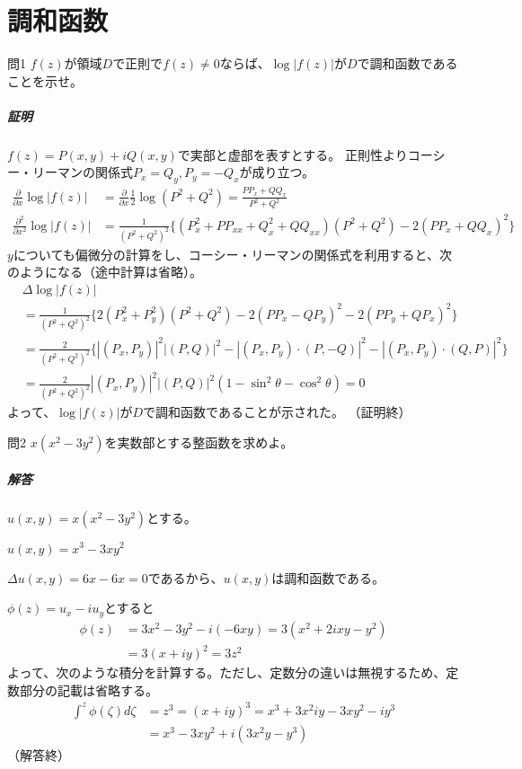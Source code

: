 \chapter{調和函数}%

\begin{mysimplebox}{問1}
    $f(z)$が領域$D$で正則で$f(z)\neq0$ならば、$\log|f(z)|$が$D$で調和函数であることを示せ。
\end{mysimplebox}
\paragraph{証明}
$f(z)=P(x,y)+iQ(x,y)$で実部と虚部を表すとする。
正則性よりコーシー・リーマンの関係式$P_x=Q_y,P_y=-Q_x$が成り立つ。
\begin{align*}
    \frac{\partial}{\partial x}\log|f(z)|
    &=\frac{\partial}{\partial x}\frac{1}{2}\log(P^2+Q^2)
    =\frac{PP_x+QQ_x}{P^2+Q^2}\\
    \frac{\partial^2}{\partial x^2}\log|f(z)|
    &=\frac{1}{(P^2+Q^2)^2}\{(P_x^2+PP_{xx}+Q_x^2+QQ_{xx})(P^2+Q^2)-2(PP_x+QQ_x)^2\}
\end{align*}
$y$についても偏微分の計算をし、コーシー・リーマンの関係式を利用すると、次のようになる（途中計算は省略）。
\begin{align*}
    &\Delta\log|f(z)|\\
    &=\frac{1}{(P^2+Q^2)^2}\{2(P_x^2+P_y^2)(P^2+Q^2)-2(PP_x-QP_y)^2-2(PP_y+QP_x)^2\}\\
    &=\frac{2}{(P^2+Q^2)^2}\{|(P_x,P_y)|^2|(P,Q)|^2-|(P_x,P_y)\cdot(P,-Q)|^2-|(P_x,P_y)\cdot(Q,P)|^2\}\\
    &=\frac{2}{(P^2+Q^2)^2}|(P_x,P_y)|^2|(P,Q)|^2(1-\sin^2\theta-\cos^2\theta)=0
\end{align*}
よって、$\log|f(z)|$が$D$で調和函数であることが示された。
（証明終）

\newpage
\begin{mysimplebox}{問2}
    $x(x^2-3y^2)$を実数部とする整函数を求めよ。
\end{mysimplebox}
\paragraph{解答}
$u(x,y)=x(x^2-3y^2)$とする。

$u(x,y)=x^3-3xy^2$

$\Delta u(x,y)=6x-6x=0$であるから、$u(x,y)$は調和函数である。

$\phi(z)=u_x-iu_y$とすると
\begin{align*}
    \phi(z)&=3x^2-3y^2-i(-6xy)=3(x^2+2ixy-y^2)\\
    &=3(x+iy)^2=3z^2
\end{align*}
よって、次のような積分を計算する。ただし、定数分の違いは無視するため、定数部分の記載は省略する。
\begin{align*}
    \int^{z}\phi(\zeta)d\zeta
    &=z^3=(x+iy)^3=x^3+3x^2iy-3xy^2-iy^3\\
    &=x^3-3xy^2+i(3x^2y-y^3)
\end{align*}
（解答終）

